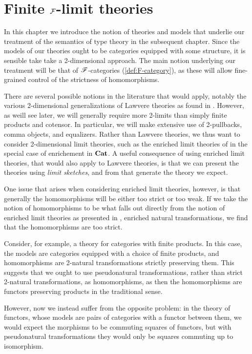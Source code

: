 \documentclass[../thesis.tex]{subfiles}
\begin{document}
\chapter{Finite \texorpdfstring{${\mathcal{F}}$}{F}-limit theories}\label{ch:F-theories}
In this chapter we introduce the notion of theories and models that underlie our treatment of
the semantics of type theory in the subsequent chapter. Since the models of our theories ought
to be categories equipped with some structure, it is sensible take take a 2-dimensional approach.
The main notion underlying our treatment will be that of ${\mathscr{F}}$-categories (\cref{def:F-category}),
as these will allow fine-grained control of the strictness of homomorphisms.

There are several possible notions in the literature that would apply, notably the various 2-dimensional
generalizations of Lawvere theories as found in \cite{gray1973, nishizawa2009}. However,
as weill see later, we will generally require more 2-limits than simply finite products and cotensor.
In particular, we will make extensive use of 2-pullbacks, comma objects, and equalizers. Rather than
Lawvere theories, we thus want to consider 2-dimensional limit theories, such as the enriched limit
theories of \cite{kelly1982a} in the special case of enrichement in ${\mathbf{Cat}}$. A useful consequence of
using enriched limit theories, that would also apply to Lawvere theories, is that we can present
the theories using \emph{limit sketches}, and from that generate the theory we expect. 

\begin{remark}
  One issue that arises when considering enriched limit theories, however, is that generally the
  homomorphisms will be either too strict or too weak. If we take the notion of homomorphisms to
  be what falls out directly from the notion of enriched limit theories as presented in \cite{kelly1982a},
  enriched natural transformations, we find that the homomorphisms are too strict.

  Consider, for example, a theory for categories with finite products. In this case, the models are
  categories equipped with a choice of finite products, and homomorphisms are 2-natural transformations
  strictly preserving them. This suggests that we ought to use pseudonatural transformations, rather than
  strict 2-natural transformations, as homomorphisms, as then the homomorphisms are functors 
  preserving products in the traditional sense.

  However, now we instead suffer from the opposite problem: in the theory of functors, whose models are
  pairs of categories with a functor between them, we would expect the morphisms to be commuting squares
  of functors, but with pseudonatural transformations they would only be squares commuting up to isomorphism.
\end{remark}
\end{document}
